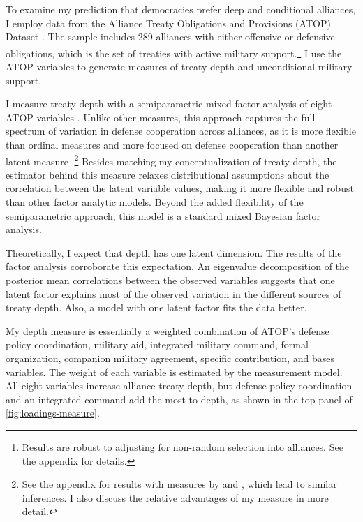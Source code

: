 \documentclass[12pt]{article}
\begin{document}
To examine my prediction that democracies prefer deep and conditional alliances, I employ data from the Alliance Treaty Obligations and Provisions (ATOP) Dataset \citep{Leedsetal2002}. 
The sample includes 289 alliances with either offensive or defensive obligations, which is the set of treaties with active military support.\footnote{Results are robust to adjusting for non-random selection into alliances. See the appendix for details.}
I use the ATOP variables to generate measures of treaty depth and unconditional military support. 


I measure treaty depth with a semiparametric mixed factor analysis of eight ATOP variables \citep{Murrayetal2013}.
Unlike other measures, this approach captures the full spectrum of variation in defense cooperation across alliances, as it is more flexible than ordinal measures \citep{LeedsAnac2005} and more focused on defense cooperation than another latent measure \citep{BensonClinton2016}.\footnote{See the appendix for results with measures by \citet{LeedsAnac2005} and \citet{BensonClinton2016}, which lead to similar inferences. I also discuss the relative advantages of my measure in more detail.}
Besides matching my conceptualization of treaty depth, the estimator behind this measure relaxes distributional assumptions about the correlation between the latent variable values, making it more flexible and robust than other factor analytic models. 
Beyond the added flexibility of the semiparametric approach, this model is a standard mixed Bayesian factor analysis. 


Theoretically, I expect that depth has one latent dimension. 
The results of the factor analysis corroborate this expectation.
An eigenvalue decomposition of the posterior mean correlations between the observed variables suggests that one latent factor explains most of the observed variation in the different sources of treaty depth. 
Also, a model with one latent factor fits the data better. 


My depth measure is essentially a weighted combination of ATOP's defense policy coordination, military aid, integrated military command, formal organization, companion military agreement, specific contribution, and bases variables.
The weight of each variable is estimated by the measurement model.  
All eight variables increase alliance treaty depth, but defense policy coordination and an integrated command add the most to depth, as shown in the top panel of \autoref{fig:loadings-measure}. 
\end{document}
